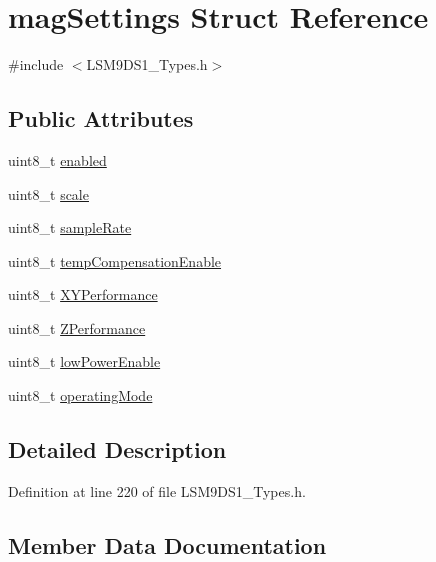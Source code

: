 \hypertarget{structmag_settings}{}\section{mag\+Settings Struct Reference}
\label{structmag_settings}


{\ttfamily \#include $<$L\+S\+M9\+D\+S1\+\_\+\+Types.\+h$>$}

\subsection*{Public Attributes}
\begin{DoxyCompactItemize}
\item 
uint8\+\_\+t \hyperlink{structmag_settings_a97f8e5c4baf3fc9a662f84fedb188f3c}{enabled}
\item 
uint8\+\_\+t \hyperlink{structmag_settings_a5966915104376cb76d9eb787bab024bc}{scale}
\item 
uint8\+\_\+t \hyperlink{structmag_settings_aca3dbf81e533dce344e618a3df199c1e}{sample\+Rate}
\item 
uint8\+\_\+t \hyperlink{structmag_settings_afcfa1e532fa140e42dc34a4abd7926ae}{temp\+Compensation\+Enable}
\item 
uint8\+\_\+t \hyperlink{structmag_settings_ad36c7bb251858fb289841c91fb615a5f}{X\+Y\+Performance}
\item 
uint8\+\_\+t \hyperlink{structmag_settings_a0ab41f0670a3fd20ce1a43332f6fe949}{Z\+Performance}
\item 
uint8\+\_\+t \hyperlink{structmag_settings_abd59df268c0798fceacea68b956009df}{low\+Power\+Enable}
\item 
uint8\+\_\+t \hyperlink{structmag_settings_ae3f0044de2fbdff6d7b830c36f26c450}{operating\+Mode}
\end{DoxyCompactItemize}


\subsection{Detailed Description}


Definition at line 220 of file L\+S\+M9\+D\+S1\+\_\+\+Types.\+h.



\subsection{Member Data Documentation}
